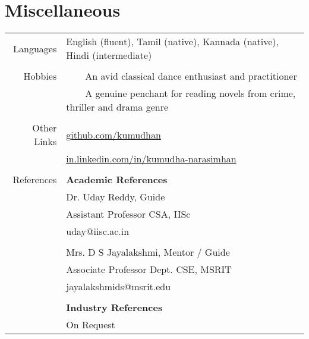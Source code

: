 \documentclass[a4paper,10pt]{article} %
\newcommand{\tabitem}{~~\llap{\textbullet}~~}
\begin{document}
\section{Miscellaneous}
\begin{tabular}{rl}
Languages & English (fluent), Tamil (native), Kannada (native), Hindi (intermediate)\\
&\\
Hobbies & \tabitem An avid classical dance enthusiast and practitioner\\
& \tabitem A genuine penchant for reading novels from crime, thriller and drama genre\\
& \\
Other Links & \href{https://github.com/kumudhan}{github.com/kumudhan} \\
& \href{http://in.linkedin.com/in/kumudha-narasimhan}{in.linkedin.com/in/kumudha-narasimhan}\\
&\\
References & \textbf{Academic References} \\
& Dr. Uday Reddy, Guide \\
& Assistant Professor CSA, IISc\\
& uday@iisc.ac.in \\
&\\
& Mrs. D S Jayalakshmi, Mentor / Guide  \\
& Associate Professor Dept. CSE, MSRIT \\
& jayalakshmids@msrit.edu\\
&\\

& \textbf{Industry References} \\
& On Request \\
\end{tabular}
\end{document}
